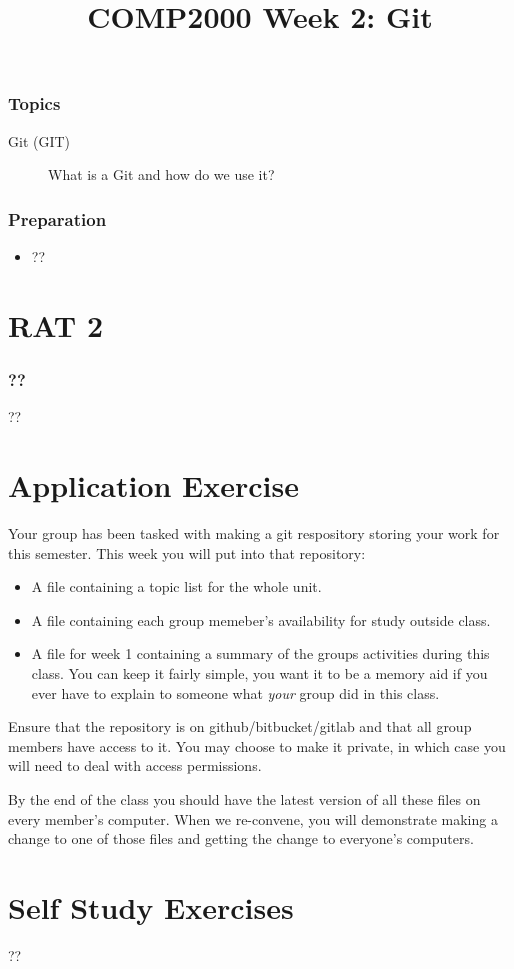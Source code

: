 \documentclass[twoside=false,DIV=14]{scrartcl}
\title{\color{redish} \vspace{-1em}COMP2000 Week 2: Git}
\begin{document}
{\color{blackish}\maketitle}\vspace{-7em}

\begin{abstract}
\end{abstract}

\section*{Topics}
\begin{description}
\item[Git (GIT)]  What is a Git and how do we use it?
\end{description}
\section*{Preparation}
\begin{itemize}
\item ??
\end{itemize}


\newpage
\part*{RAT 2}
\section*{??}
??

\newpage
\part*{Application Exercise}
Your group has been tasked with making a git respository storing your work for this semester.  This week you will put into that repository:
\begin{itemize}
    \item A file containing a topic list for the whole unit.
    \item A file containing each group memeber's availability for study outside class.
    \item A file for week 1 containing a summary of the groups activities during this class. You can keep it fairly simple, you want it to be a memory aid if you ever have to explain to someone what \emph{your} group did in this class.
\end{itemize}
Ensure that the repository is on github/bitbucket/gitlab and that all group members have access to it.  You may choose to make it private, in which case you will need to deal with access permissions.

By the end of the class you should have the latest version of all these files on every member's computer.  When we re-convene, you will demonstrate making a change to one of those files and getting the change to everyone's computers.

\newpage
\part*{Self Study Exercises}
??
\end{document}
